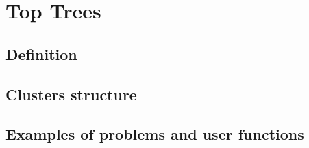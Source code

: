 \chapter{Top Trees}

\section{Definition}

\section{Clusters structure}

\section{Examples of problems and user functions}

